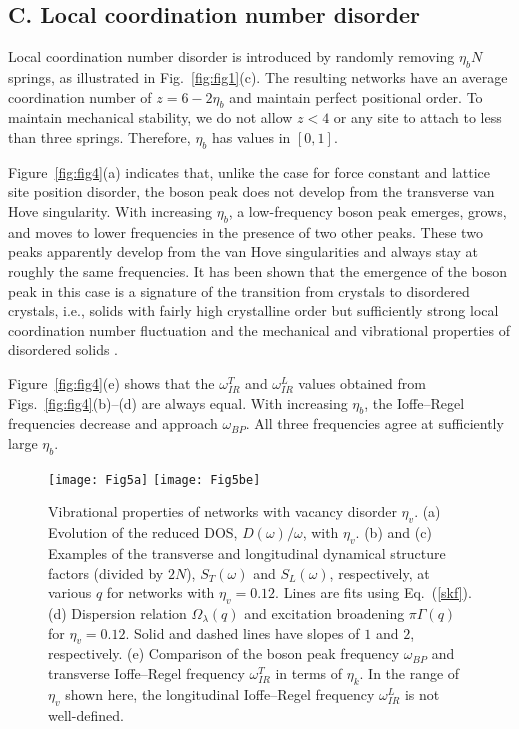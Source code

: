 \documentclass[twocolumn,printnumbers,amsmath,amssymb,prl,verbatim]{revtex4}
\begin{document}
\subsection{C. Local coordination number disorder}
\label{subsec:bond}

Local coordination number disorder is introduced by randomly removing $\eta_b N$ springs, as illustrated in Fig.~\ref{fig:fig1}(c). The resulting networks have an average coordination number of $z=6 - 2\eta_b$ and maintain perfect positional order. To maintain mechanical stability, we do not allow $z<4$ or any site to attach to less than three springs. Therefore, $\eta_b$ has values in $[0, 1]$.

Figure~\ref{fig:fig4}(a) indicates that, unlike the case for force constant and lattice site position disorder, the boson peak does not develop from the transverse van Hove singularity. With increasing $\eta_b$, a low-frequency boson peak emerges, grows, and moves to lower frequencies in the presence of two other peaks. These two peaks apparently develop from the van Hove singularities and always stay at roughly the same frequencies. It has been shown that the emergence of the boson peak in this case is a signature of the transition from crystals to disordered crystals, i.e., solids with fairly high crystalline order but sufficiently strong local coordination number fluctuation and the mechanical and vibrational properties of disordered solids \cite{huatong}.

Figure~\ref{fig:fig4}(e) shows that the $\omega_{IR}^T$ and $\omega_{IR}^L$ values obtained from Figs.~\ref{fig:fig4}(b)--(d) are always equal. With increasing $\eta_b$, the Ioffe--Regel frequencies decrease and approach $\omega_{BP}$. All three frequencies agree at sufficiently large $\eta_b$.

\begin{figure}
	\texttt{[image: Fig5a]}
	\texttt{[image: Fig5be]}
\caption{\label{fig:fig5} Vibrational properties of networks with vacancy disorder $\eta_v$. (a) Evolution of the reduced DOS, $D(\omega)/\omega$, with $\eta_v$. (b) and (c) Examples of the transverse and longitudinal dynamical structure factors (divided by $2N$), $S_{T}(\omega)$ and $S_{L}(\omega)$, respectively, at various $q$ for networks with $\eta_v=0.12$. Lines are fits using Eq.~(\ref{skf}). (d) Dispersion relation $\Omega_{\lambda}(q)$ and excitation broadening $\pi\Gamma(q)$ for $\eta_v=0.12$. Solid and dashed lines have slopes of $1$ and $2$, respectively. (e) Comparison of the boson peak frequency $\omega_{BP}$ and transverse Ioffe--Regel frequency $\omega_{IR}^T$ in terms of $\eta_k$. In the range of $\eta_v$ shown here, the longitudinal Ioffe--Regel frequency $\omega_{IR}^L$ is not well-defined.
}
\end{figure}
\end{document}
